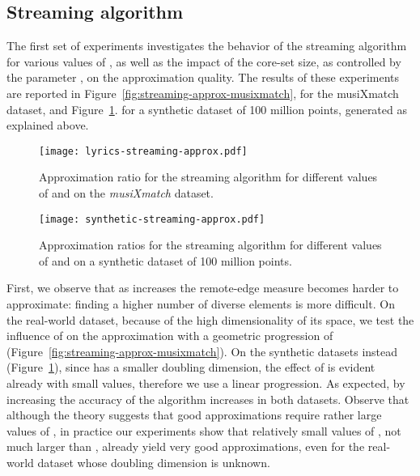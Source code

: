 \documentclass{article}
\begin{document}
\subsection{Streaming algorithm}\label{sec:streaming-experiments}

The first set of experiments investigates the behavior of the
streaming algorithm for various values of , as well as the impact
of the core-set size, as controlled by the parameter , on the
approximation quality. The results of these experiments are reported
in Figure~\ref{fig:streaming-approx-musixmatch},
for the musiXmatch dataset, and Figure~\ref{fig:streaming-approx-synthetic}.
for a synthetic dataset of 100 million points, generated as explained above.

\begin{figure}[t]
  \begin{minipage}{.49\linewidth}
    \centering
    \texttt{[image: lyrics-streaming-approx.pdf]}
    \caption{Approximation ratio for the streaming algorithm for different values of  and  on the \emph{musiXmatch} dataset.}\label{fig:streaming-approx-musixmatch}
  \end{minipage}
  \hfill
  \begin{minipage}{.49\linewidth}
    \centering
    \texttt{[image: synthetic-streaming-approx.pdf]}
    \caption{Approximation ratios for the streaming algorithm for different values of  and  on a synthetic dataset of 100 million points.}\label{fig:streaming-approx-synthetic}
  \end{minipage}
\end{figure}

First, we observe that as  increases the remote-edge measure becomes harder to approximate: finding a higher number of diverse elements is more difficult.
On the real-world dataset, because of the high dimensionality of its
space, we test the influence of  on the approximation with a
geometric progression of 
(Figure~\ref{fig:streaming-approx-musixmatch}).  On the synthetic
datasets instead (Figure~\ref{fig:streaming-approx-synthetic}), since
 has a smaller doubling dimension, the effect of  is
evident already with small values, therefore we use a linear
progression.
As expected, by increasing  the accuracy of the algorithm increases in both
datasets. Observe that although the theory suggests that good
approximations require rather large values of , in practice our experiments show that
relatively small values of , not much larger than , already
yield very good approximations, even for the real-world dataset
whose doubling dimension is unknown.
\end{document}
